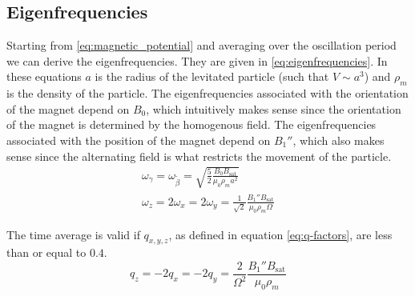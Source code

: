 \subsection{Eigenfrequencies}
\label{subsec:eigenfrequencies}
Starting from \autoref{eq:magnetic_potential} and averaging over the oscillation period we can derive the eigenfrequencies. They are given in \autoref{eq:eigenfrequencies}. In these equations $a$ is the radius of the levitated particle (such that $V \sim a^3$) and $\rho_m$ is the density of the particle. The eigenfrequencies associated with the orientation of the magnet depend on $B_0$, which intuitively makes sense since the orientation of the magnet is determined by the homogenous field. The eigenfrequencies associated with the position of the magnet depend on $B_1''$, which also makes sense since the alternating field is what restricts the movement of the particle.
\begin{equation}
    \begin{gathered}
        \omega_\gamma = \omega_{\tilde\beta} = \sqrt{\frac{5}{2}\frac{B_0B_\text{sat}}{\mu_0 \rho_m a^2}} \\
        \omega_z = 2\omega_x = 2\omega_y = \frac{1}{\sqrt{2}}\frac{B_1''B_\text{sat}}{\mu_0\rho_m\Omega}
    \end{gathered}
    \label{eq:eigenfrequencies}
\end{equation}

The time average is valid if $q_{x,y,z}$, as defined in equation \ref{eq:q-factors}, are less than or equal to $0.4$.
\begin{equation}
    q_z = -2q_x = -2q_y = \frac{2}{\Omega^2}\frac{B_1''B_{\text{sat}}}{\mu_0\rho_m}
    \label{eq:q-factors}
\end{equation}
